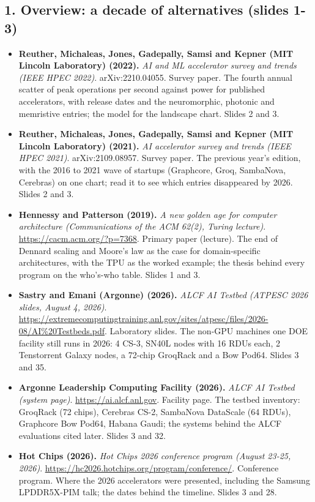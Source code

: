 \documentclass[11pt,letterpaper]{article}
\begin{document}
\subsection*{1. Overview: a decade of alternatives (slides 1-3)}
\begin{itemize}[leftmargin=1.2em,itemsep=3pt]\sloppy
\item \textbf{Reuther, Michaleas, Jones, Gadepally, Samsi and Kepner (MIT Lincoln Laboratory) (2022).} \textit{AI and ML accelerator survey and trends (IEEE HPEC 2022)}. arXiv:2210.04055. Survey paper. The fourth annual scatter of peak operations per second against power for published accelerators, with release dates and the neuromorphic, photonic and memristive entries; the model for the landscape chart. Slides 2 and 3.
\item \textbf{Reuther, Michaleas, Jones, Gadepally, Samsi and Kepner (MIT Lincoln Laboratory) (2021).} \textit{AI accelerator survey and trends (IEEE HPEC 2021)}. arXiv:2109.08957. Survey paper. The previous year's edition, with the 2016 to 2021 wave of startups (Graphcore, Groq, SambaNova, Cerebras) on one chart; read it to see which entries disappeared by 2026. Slides 2 and 3.
\item \textbf{Hennessy and Patterson (2019).} \textit{A new golden age for computer architecture (Communications of the ACM 62(2), Turing lecture)}. \url{https://cacm.acm.org/?p=7368}. Primary paper (lecture). The end of Dennard scaling and Moore's law as the case for domain-specific architectures, with the TPU as the worked example; the thesis behind every program on the who's-who table. Slides 1 and 3.
\item \textbf{Sastry and Emani (Argonne) (2026).} \textit{ALCF AI Testbed (ATPESC 2026 slides, August 4, 2026)}. \url{https://extremecomputingtraining.anl.gov/sites/atpesc/files/2026-08/AI%20Testbeds.pdf}. Laboratory slides. The non-GPU machines one DOE facility still runs in 2026: 4 CS-3, SN40L nodes with 16 RDUs each, 2 Tenstorrent Galaxy nodes, a 72-chip GroqRack and a Bow Pod64. Slides 3 and 35.
\item \textbf{Argonne Leadership Computing Facility (2026).} \textit{ALCF AI Testbed (system page)}. \url{https://ai.alcf.anl.gov}. Facility page. The testbed inventory: GroqRack (72 chips), Cerebras CS-2, SambaNova DataScale (64 RDUs), Graphcore Bow Pod64, Habana Gaudi; the systems behind the ALCF evaluations cited later. Slides 3 and 32.
\item \textbf{Hot Chips (2026).} \textit{Hot Chips 2026 conference program (August 23-25, 2026)}. \url{https://hc2026.hotchips.org/program/conference/}. Conference program. Where the 2026 accelerators were presented, including the Samsung LPDDR5X-PIM talk; the dates behind the timeline. Slides 3 and 28.

\end{itemize}
\end{document}
